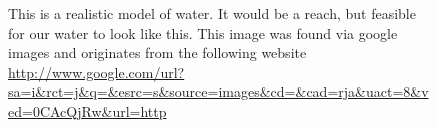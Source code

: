 \documentclass[dvips,12pt]{article}
\begin{document}
 
\begin{figure}
\begin{center}
\end{center}

\caption{This is a realistic model of water. It would be a reach, but feasible for our water to look like this. This image was found via google images and originates from the following website \url{http://www.google.com/url?sa=i&rct=j&q=&esrc=s&source=images&cd=&cad=rja&uact=8&ved=0CAcQjRw&url=http}
\label{m43}}

\end{figure}
\end{document}
